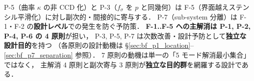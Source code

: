 \noindent P-5（曲率 $\kappa$ の非 CCD 化）と P-3（$f_\sigma$ を $p$ と同幾何）は
F-5（界面越えステンシル平滑化）に対し副次的・間接的に寄与する．
P-7（sub-system 分離）は F-1・F-2 の\textbf{設計レベル}での発生を防ぐ予防策．
\textbf{F-1..F-5 への主解消は P-1, P-2, P-4, P-6 の 4 原則}が担い，
P-3, P-5, P-7 は次数改善・設計予防として\textbf{独立な設計目的}を持つ
（各原則の設計動機は §\ref{sec:bf_p1_location}--\ref{sec:bf_p7_separation} 参照）．
7 原則の動機は単一の「5 モード解消最小集合」ではなく，
主解消 4 原則と副次寄与 3 原則が\textbf{独立な目的群}を網羅する設計である．

